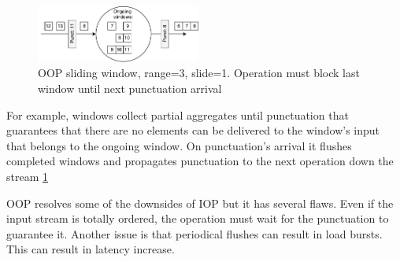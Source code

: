 \begin{figure}[htbp]
  \centering
  \includegraphics[width=0.48\textwidth]{pics/oop}
  \caption{OOP sliding window, range=3, slide=1. Operation must block last window until next punctuation arrival }
  \label {oop}
\end{figure}

For example, windows collect partial aggregates until punctuation that guarantees that there are no elements can be delivered to the window's input that belongs to the ongoing window.  On punctuation's arrival it flushes completed windows and propagates punctuation to the next operation down the stream \ref{oop}

OOP resolves some of the downsides of IOP but it has several flaws. Even if the input stream is totally ordered, the operation must wait for the punctuation to guarantee it. Another issue is that periodical flushes can result in load bursts. This can result in latency increase.
